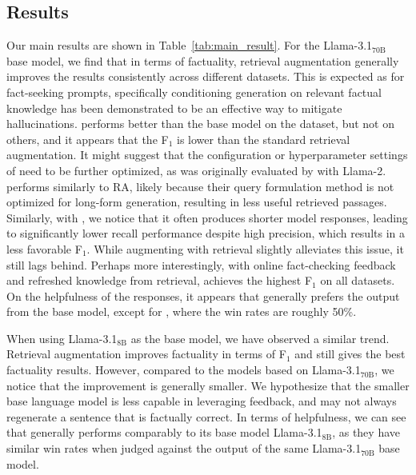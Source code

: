 \subsection{Results}








Our main results are shown in Table~\ref{tab:main_result}. For the Llama-3.1$_{\text{70B}}$ base model, we find that in terms of factuality, retrieval augmentation generally improves the results consistently across different datasets. 
This is expected as for fact-seeking prompts, specifically conditioning generation on relevant factual knowledge has been demonstrated to be an effective way to mitigate hallucinations.
\nest performs better than the base model on the \bio dataset, but not on others, and it appears that the \vs F$_1$ is lower than the standard retrieval augmentation.
It might suggest that the configuration or hyperparameter settings of \nest need to be further optimized, as \nest was originally evaluated by \bio with Llama-2. \dragin performs similarly to RA, likely because their query formulation method is not optimized for long-form generation, resulting in less useful retrieved passages. Similarly, with \cove, we notice that it often produces shorter model responses, leading to significantly lower recall performance despite high precision, which results in a less favorable \vs F$_1$. While augmenting \cove with retrieval slightly alleviates this issue, it still lags behind.
Perhaps more interestingly, with online fact-checking feedback and refreshed knowledge from retrieval, \model achieves the highest \vs F$_1$ on all datasets. On the helpfulness of the responses, it appears that \alpacaE generally prefers the output from the base model, except for \model, where the win rates are roughly 50\%.

When using Llama-3.1$_{\text{8B}}$ as the base model, we have observed a similar trend. Retrieval augmentation improves factuality in terms of \vs F$_1$ and \model still gives the best factuality results. However, compared to the models based on Llama-3.1$_{\text{70B}}$, we notice that the improvement is generally smaller.
We hypothesize that the smaller base language model is less capable in leveraging feedback, and may not always regenerate a sentence that is factually correct.
In terms of helpfulness, we can see that \model generally performs comparably to its base model Llama-3.1$_{\text{8B}}$, as they have similar win rates when judged against the output of the same Llama-3.1$_{\text{70B}}$ base model.  

